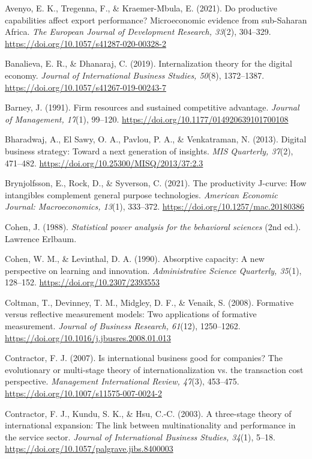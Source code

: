 \documentclass[12pt,a4paper]{article}
\begin{document}
Avenyo, E. K., Tregenna, F., \& Kraemer-Mbula, E. (2021). Do productive
capabilities affect export performance? Microeconomic evidence from
sub-Saharan Africa. \emph{The European Journal of Development Research,
33}(2), 304--329. \url{https://doi.org/10.1057/s41287-020-00328-2}

Banalieva, E. R., \& Dhanaraj, C. (2019). Internalization theory for the
digital economy. \emph{Journal of International Business Studies,
50}(8), 1372--1387. \url{https://doi.org/10.1057/s41267-019-00243-7}

Barney, J. (1991). Firm resources and sustained competitive advantage.
\emph{Journal of Management, 17}(1), 99--120.
\url{https://doi.org/10.1177/014920639101700108}

Bharadwaj, A., El Sawy, O. A., Pavlou, P. A., \& Venkatraman, N. (2013).
Digital business strategy: Toward a next generation of insights.
\emph{MIS Quarterly, 37}(2), 471--482.
\url{https://doi.org/10.25300/MISQ/2013/37:2.3}

Brynjolfsson, E., Rock, D., \& Syverson, C. (2021). The productivity
J-curve: How intangibles complement general purpose technologies.
\emph{American Economic Journal: Macroeconomics, 13}(1), 333--372.
\url{https://doi.org/10.1257/mac.20180386}

Cohen, J. (1988). \emph{Statistical power analysis for the behavioral
sciences} (2nd ed.). Lawrence Erlbaum.

Cohen, W. M., \& Levinthal, D. A. (1990). Absorptive capacity: A new
perspective on learning and innovation. \emph{Administrative Science
Quarterly, 35}(1), 128--152. \url{https://doi.org/10.2307/2393553}

Coltman, T., Devinney, T. M., Midgley, D. F., \& Venaik, S. (2008).
Formative versus reflective measurement models: Two applications of
formative measurement. \emph{Journal of Business Research, 61}(12),
1250--1262. \url{https://doi.org/10.1016/j.jbusres.2008.01.013}

Contractor, F. J. (2007). Is international business good for companies?
The evolutionary or multi-stage theory of internationalization vs. the
transaction cost perspective. \emph{Management International Review,
47}(3), 453--475. \url{https://doi.org/10.1007/s11575-007-0024-2}

Contractor, F. J., Kundu, S. K., \& Hsu, C.-C. (2003). A three-stage
theory of international expansion: The link between multinationality and
performance in the service sector. \emph{Journal of International
Business Studies, 34}(1), 5--18.
\url{https://doi.org/10.1057/palgrave.jibs.8400003}
\end{document}
